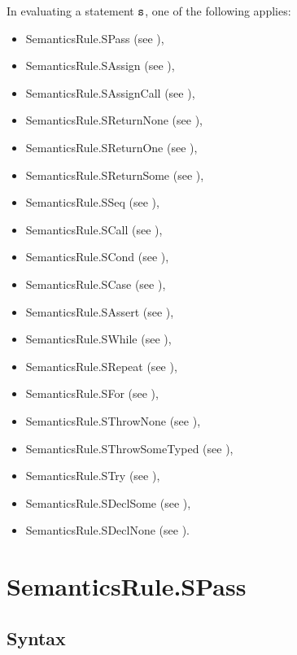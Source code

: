\documentclass{book}
\begin{document}
In evaluating a statement $\texttt{s}$, one of the following applies:
\begin{itemize}
\item SemanticsRule.SPass (see ),
\item SemanticsRule.SAssign (see ),
\item SemanticsRule.SAssignCall (see ),
\item SemanticsRule.SReturnNone (see ),
\item SemanticsRule.SReturnOne (see ),
\item SemanticsRule.SReturnSome (see ),
\item SemanticsRule.SSeq (see ),
\item SemanticsRule.SCall (see ),
\item SemanticsRule.SCond (see ),
\item SemanticsRule.SCase (see ),
\item SemanticsRule.SAssert (see ),
\item SemanticsRule.SWhile (see ),
\item SemanticsRule.SRepeat (see ),
\item SemanticsRule.SFor (see ),
\item SemanticsRule.SThrowNone (see ),
\item SemanticsRule.SThrowSomeTyped (see ),
\item SemanticsRule.STry (see ),
\item SemanticsRule.SDeclSome (see ),
\item SemanticsRule.SDeclNone (see ).
\end{itemize}

\section{SemanticsRule.SPass \label{sec:SemanticsRule.SPass}}
\subsection{Syntax}
\end{document}
